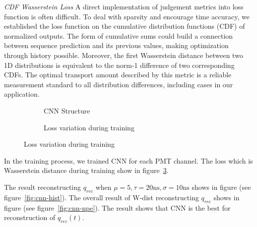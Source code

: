 \emph{CDF Wasserstein Loss}
A direct implementation of judgement metrics into loss function is often difficult. To deal with sparsity and encourage time accuracy, we established the loss function on the cumulative distribution functions (CDF) of normalized outputs. The form of cumulative sums could build a connection between sequence prediction and its previous values, making optimization through history possible. Moreover, the first Wasserstein distance between two 1D distributions is equivalent to the norm-1 difference of two corresponding CDFs. The optimal transport amount described by this metric is a reliable measurement standard to all distribution differences, including cases in our application.

\begin{figure}[H]
\begin{minipage}[b]{.4\textwidth}
\begin{figure}[H]
    \begin{center}
    \begin{adjustbox}{width=0.6\textwidth}
        
    \end{adjustbox}
    \end{center}
    \caption{\label{fig:struct} CNN Structure}
\end{figure}
\end{minipage}
\begin{minipage}[b]{.6\textwidth}
\begin{figure}[H]
    \centering
    \resizebox{\textwidth}{!}{}
    \caption{\label{fig:loss} Loss variation during training}
\end{figure}
\end{minipage}
\end{figure}

In the training process, we trained CNN for each PMT channel. The loss which is Wasserstein distance during training show in figure~\ref{fig:loss}. 

The result reconstructing $q_{rec}$ when $\mu=5, \tau=20\mathrm{ns}, \sigma=10\mathrm{ns}$ shows in figure (see figure~\ref{fig:cnn-hist}). The overall result of W-dist reconstructing $q_{rec}$ shows in figure (see figure~\ref{fig:cnn-npe}). The result shows that CNN is the best for reconstruction of $q_{rec}(t)$. 

